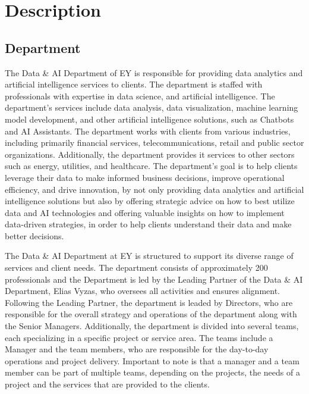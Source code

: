 \chapter{Description}
\label{ch:description}

\section{Department}

The Data \& AI Department of EY is responsible for providing data analytics and
artificial intelligence services to clients. The department is staffed with
professionals with expertise in data science, and artificial intelligence. The
department's services include data analysis, data visualization, machine
learning model development, and other artificial intelligence solutions, such
as Chatbots and AI Assistants. The department works with clients from various
industries, including primarily financial services, telecommunications, retail
and public sector organizations. Additionally, the department provides it
services to other sectors such as energy, utilities, and healthcare. The
department's goal is to help clients leverage their data to make informed
business decisions, improve operational efficiency, and drive innovation, by
not only providing data analytics and artificial intelligence solutions but
also by offering strategic advice on how to best utilize data and AI
technologies and offering valuable insights on how to implement data-driven
strategies, in order to help clients understand their data and make better
decisions.

The Data \& AI Department at EY is structured to support its diverse range of
services and client needs. The department consists of approximately 200
professionals and the Department is led by the Leading Partner of the Data \&
AI Department, Elias Vyzas, who oversees all activities and ensures alignment.
Following the Leading Partner, the department is leaded by Directors, who are
responsible for the overall strategy and operations of the department along
with the Senior Managers. Additionally, the department is divided into several
teams, each specializing in a specific project or service area. The teams
include a Manager and the team members, who are responsible for the day-to-day
operations and project delivery. Important to note is that a manager and a team
member can be part of multiple teams, depending on the projects, the needs of a
project and the services that are provided to the clients.

